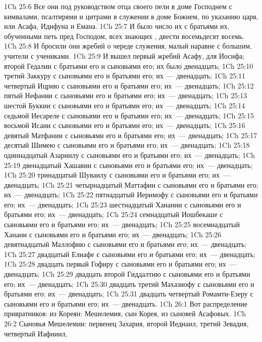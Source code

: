 \vs 1Ch 25:6 Все они под руководством отца своего пели в доме Господнем с кимвалами, псалтирями и цитрами в служении в доме Божием, по указанию царя, или Асафа, Идифуна и Емана.
\vs 1Ch 25:7 И было число их с братьями их, обученными петь пред Господом, всех знающих , двести восемьдесят восемь.
\rsbpar\vs 1Ch 25:8 И бросили они жребий о череде служения, малый наравне с большим, учители  с учениками.
\vs 1Ch 25:9 И вышел первый жребий Асафу, для Иосифа; второй Гедалии с братьями его и сыновьями его; их было двенадцать;
\vs 1Ch 25:10 третий Заккуру с сыновьями его и братьями его; их~--- двенадцать;
\vs 1Ch 25:11 четвертый Ицрию с сыновьями его и братьями его; их~--- двенадцать;
\vs 1Ch 25:12 пятый Нефании с сыновьями его и братьями его; их~--- двенадцать;
\vs 1Ch 25:13 шестой Буккии с сыновьями его и братьями его; их~--- двенадцать;
\vs 1Ch 25:14 седьмой Иесареле с сыновьями его и братьями его; их~--- двенадцать;
\vs 1Ch 25:15 восьмой Исаии с сыновьями его и братьями его; их~--- двенадцать;
\vs 1Ch 25:16 девятый Матфании с сыновьями его и братьями его; их~--- двенадцать;
\vs 1Ch 25:17 десятый Шимею с сыновьями его и братьями его; их~--- двенадцать;
\vs 1Ch 25:18 одиннадцатый Азариилу с сыновьями его и братьями его; их~--- двенадцать;
\vs 1Ch 25:19 двенадцатый Хашавии с сыновьями его и братьями его; их~--- двенадцать;
\vs 1Ch 25:20 тринадцатый Шуваилу с сыновьями его и братьями его; их~--- двенадцать;
\vs 1Ch 25:21 четырнадцатый Маттафии с сыновьями его и братьями его; их~--- двенадцать;
\vs 1Ch 25:22 пятнадцатый Иеримофу с сыновьями его и братьями его; их~--- двенадцать;
\vs 1Ch 25:23 шестнадцатый Ханании с сыновьями его и братьями его; их~--- двенадцать;
\vs 1Ch 25:24 семнадцатый Иошбекаше с сыновьями его и братьями его; их~--- двенадцать;
\vs 1Ch 25:25 восемнадцатый Ханани с сыновьями его и братьями его; их~--- двенадцать;
\vs 1Ch 25:26 девятнадцатый Маллофию с сыновьями его и братьями его; их~--- двенадцать;
\vs 1Ch 25:27 двадцатый Елиафе с сыновьями его и братьями его; их~--- двенадцать;
\vs 1Ch 25:28 двадцать первый Гофиру с сыновьями его и братьями его; их~--- двенадцать;
\vs 1Ch 25:29 двадцать второй Гиддалтию с сыновьями его и братьями его; их~--- двенадцать;
\vs 1Ch 25:30 двадцать третий Махазиофу с сыновьями его и братьями его; их~--- двенадцать;
\vs 1Ch 25:31 двадцать четвертый Ромамти-Езеру с сыновьями его и братьями его; их~--- двенадцать.
\vs 1Ch 26:1 Вот распределение привратников: из Кореян: Мешелемия, сын Корея, из сыновей Асафовых.
\vs 1Ch 26:2 Сыновья Мешелемии: первенец Захария, второй Иедиаил, третий Зевадия, четвертый Иафниил,
